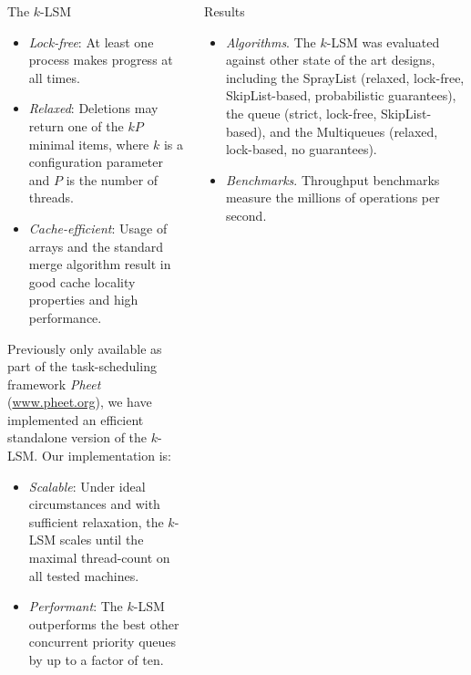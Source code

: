 \documentclass[final,hyperref={pdfpagelabels=true}]{beamer}
\newcommand{\klsm}{$k$-LSM\xspace}
\begin{document}
\begin{frame}
\begin{columns}[t]
\begin{column}{.45\textwidth}
\begin{block}{The \klsm}
\begin{itemize}
\item \emph{Lock-free}: At least one process makes progress at all times.

\item \emph{Relaxed}: Deletions may return one of the $kP$ minimal items, where
$k$ is a configuration parameter and $P$ is the number of threads.

\item \emph{Cache-efficient}: Usage of arrays and the standard merge algorithm
result in good cache locality properties and high performance.
\end{itemize}

Previously only available as part of the task-scheduling framework \emph{Pheet}
(\url{www.pheet.org}), we have implemented an efficient standalone version
of the \klsm. Our implementation is:
\begin{itemize}
\justifying
\item \emph{Scalable}: Under ideal circumstances and with sufficient
relaxation, the \klsm scales until the maximal thread-count on all tested
machines.

\item \emph{Performant}: The \klsm outperforms the best other concurrent
priority queues by up to a factor of ten.
\end{itemize}
\end{block}
\end{column}

\begin{column}{.45\textwidth}

\begin{block}{Results}
\begin{itemize}
\justifying
\item \emph{Algorithms}. The \klsm was evaluated against other state of the art designs, including
the SprayList \cite{alistarhspraylist} (relaxed, lock-free, SkipList-based, probabilistic guarantees), the
\citeauthor{linden2013skiplist} queue \cite{linden2013skiplist} (strict, lock-free, SkipList-based), and
the Multiqueues \cite{rihani2014multiqueues} (relaxed, lock-based, no guarantees).

\item \emph{Benchmarks}. Throughput benchmarks measure the millions of operations per second.

\vspace{1cm}



\end{itemize}
\end{block}
\end{column}
\end{columns}
\end{frame}
\end{document}

